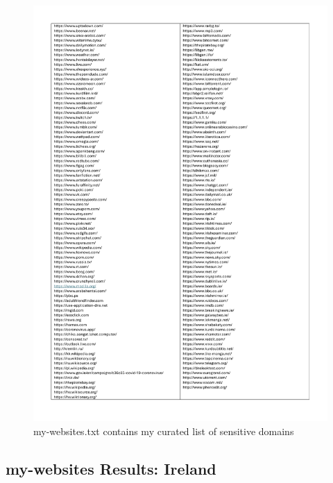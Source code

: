 \begin{figure} [H]
    \centering
    \includegraphics[width=1\linewidth]{appendix/my-webs1.pdf}
    \caption{my-websites.txt contains my curated list of sensitive domains}
    \label{fig:enter-label}
\end{figure}

\subsection{my-websites Results: Ireland}

